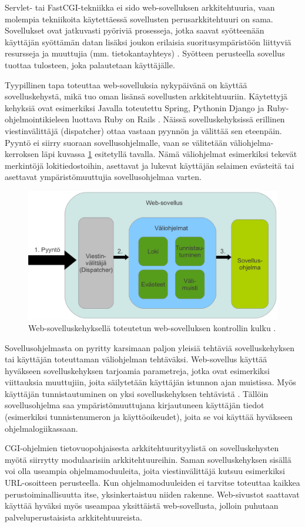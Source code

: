 Servlet- tai FastCGI-tekniikka ei sido web-sovelluksen arkkitehtuuria, vaan molempia tekniikoita käytettäessä sovellusten perusarkkitehtuuri on sama. Sovellukset ovat jatkuvasti pyöriviä prosesseja, jotka saavat syötteenään käyttäjän syöttämän datan lisäksi joukon erilaisia suoritusympäristöön liittyviä resursseja ja muuttujia (mm. tietokantayhteys) \cite{uml}. Syötteen perusteella sovellus tuottaa tulosteen, joka palautetaan käyttäjälle.

Tyypillinen tapa toteuttaa web-sovelluksia nykypäivänä on käyttää sovelluskehystä, mikä tuo oman lisänsä sovellusten arkkitehtuuriin. Käytettyjä kehyksiä ovat esimerkiksi Javalla toteutettu Spring, Pythonin Django ja Ruby-ohjelmointikieleen luottava Ruby on Rails \cite{spring, django, ruby2011agile}. Näissä sovelluskehyksissä erillinen viestinvälittäjä (dispatcher) ottaa vastaan pyynnön ja välittää sen eteenpäin. Pyyntö ei siirry suoraan sovellusohjelmalle, vaan se välitetään väliohjelma-kerroksen läpi kuvassa \ref{dispatcher} esitetyllä tavalla. Nämä väliohjelmat esimerkiksi tekevät merkintöjä lokitiedostoihin, asettavat ja lukevat käyttäjän selaimen evästeitä tai asettavat ympäristömuuttujia sovellusohjelmaa varten.

\begin{figure}[ht]
\centering
\includegraphics[width=\textwidth]{web/dispatcher.eps}
\caption{Web-sovelluskehyksellä toteutetun web-sovelluksen kontrollin kulku \cite{ruby2011agile}.}%
\label{dispatcher}
\end{figure}

Sovellusohjelmasta on pyritty karsimaan paljon yleisiä tehtäviä sovelluskehyksen tai käyttäjän toteuttaman väliohjelman tehtäväksi. Web-sovellus käyttää hyväkseen sovelluskehyksen tarjoamia parametreja, jotka ovat esimerkiksi viittauksia muuttujiin, joita säilytetään käyttäjän istunnon ajan muistissa. Myös käyttäjän tunnistautuminen on yksi sovelluskehyksen tehtävistä \cite{ruby2011agile}. Tällöin sovellusohjelma saa ympäristömuuttujana kirjautuneen käyttäjän tiedot (esimerkiksi tunnistenumeron ja käyttöoikeudet), joita se voi käyttää hyväkseen ohjelmalogiikassaan.

CGI-ohjelmien tietovuopohjaisesta arkkitehtuurityylistä on sovelluskehysten myötä siirrytty modulaarisiin arkkitehtuureihin. Saman sovelluskehyksen sisällä voi olla useampia ohjelmamoduuleita, joita viestinvälittäjä kutsuu esimerkiksi URL-osoitteen perusteella. Kun ohjelmamoduuleiden ei tarvitse toteuttaa kaikkea perustoiminallisuutta itse, yksinkertaistuu niiden rakenne. Web-sivustot saattavat käyttää hyväksi myös useampaa yksittäistä web-sovellusta, jolloin puhutaan palveluperustaisista arkkitehtuureista.